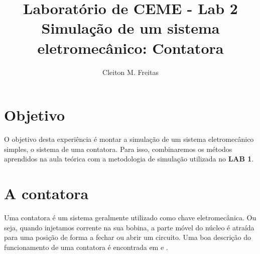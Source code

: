 \documentclass[a4paper]{article}
\title{Laboratório de CEME - Lab 2\\Simulação de um sistema eletromecânico: Contatora}
\author{Cleiton M. Freitas\\
}
\date{}
\theoremstyle{definition}
\theoremstyle{plain}
\begin{document}
\maketitle


\section{Objetivo}

O objetivo desta experiência é montar a simulação de um sistema eletromecânico simples, o sistema de uma contatora. Para isso, combinaremos os métodos aprendidos na aula teórica com a metodologia de simulação utilizada no \textbf{LAB 1}.

\section{A contatora}


Uma contatora é um sistema geralmente utilizado como chave eletromecânica. Ou seja, quando injetamos corrente na sua bobina, a parte móvel do núcleo é atraída para uma posição de forma a fechar ou abrir um circuito. Uma boa descrição do funcionamento de uma contatora é encontrada em \cite{Faustino2020} e \cite{meletrica2014}.
\end{document}
